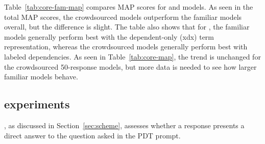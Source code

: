 Table~\ref{tab:core-fam-map} compares  MAP scores for  and  models. As seen in the total MAP scores, the crowdsourced models outperform the familiar models overall, but the difference is slight. The table also shows that for , the familiar models generally perform best with the dependent-only (xdx) term representation, whereas the crowdsourced models generally perform best with labeled dependencies. As seen in Table~\ref{tab:core-map}, the trend is unchanged for the crowdsourced 50-response models, but more data is needed to see how larger familiar models behave.



\subsection{ experiments}
\label{sec:map-answer}

, as discussed in Section~\ref{sec:scheme}, assesses whether a response presents a direct answer to the question asked in the PDT prompt.

